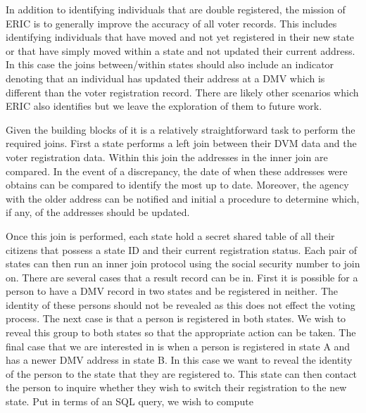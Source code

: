 In addition to identifying individuals that are double registered, the mission of ERIC is to generally improve the accuracy of all voter records. This includes identifying individuals that have moved and not yet registered in their new state or that have simply moved within a state and not updated their current address. In this case the joins between/within states should also include an indicator denoting that an individual has updated their address at a DMV which is different than the voter registration record. There are likely other scenarios which ERIC also identifies but we leave the exploration of them to future work.

Given the building blocks of  it is a relatively straightforward task to perform the required joins. First a state performs a left join between their DVM data and the voter registration data. Within this join the addresses in the inner join are compared. In the event of a discrepancy, the date of when these addresses were obtains can be compared to identify the most up to date. Moreover, the agency with the older address can be notified and initial a procedure to determine which, if any, of the addresses should be updated. 

Once this join is performed, each state hold a secret shared table of all their citizens that possess a state ID and their current registration status. Each pair of states can then run an inner join protocol using the social security number to join on. There are several cases that a result record can be in. First it is possible for a person to have a DMV record in two states and be registered in neither. The identity of these persons should not be revealed as this does not effect the voting process. The next case is that a person is registered in both states. We wish to reveal this group to both states so that the appropriate action can be taken. The final case that we are interested in is when a person is registered in state A and has a newer DMV address in state B. In this case we want to reveal the identity of the person to the state that they are registered to. This state can then contact the person to inquire whether they wish to switch their registration to the new state. Put in terms of an SQL query, we wish to compute 

